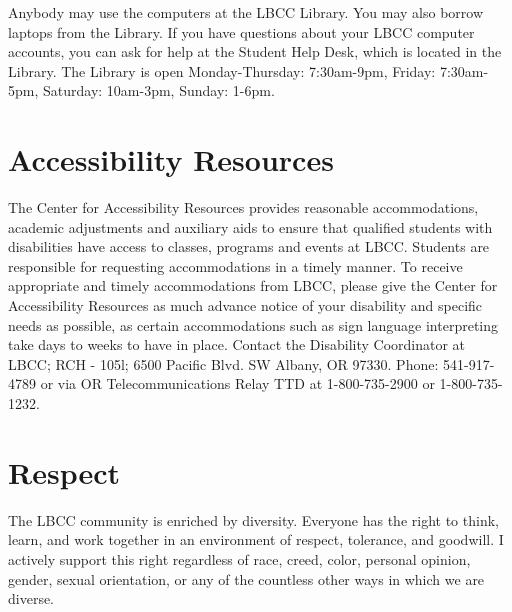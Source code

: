 \documentclass[12pt,article,oneside]{memoir}
\begin{document}
Anybody may use the computers at the LBCC Library. You may also borrow laptops from the Library.  If you have questions about your LBCC computer accounts, you can ask for help at the Student Help Desk, which is located in the Library.  The Library is open Monday-Thursday: 7:30am-9pm, Friday: 7:30am-5pm, Saturday: 10am-3pm, Sunday: 1-6pm.

\section{Accessibility Resources}

The Center for Accessibility Resources provides reasonable accommodations, academic adjustments and auxiliary aids to ensure that qualified students with disabilities have access to classes, programs and events at LBCC. Students are responsible for requesting accommodations in a timely manner. To receive appropriate and timely accommodations from LBCC, please give the Center for Accessibility Resources as much advance notice of your disability and specific needs as possible, as certain accommodations such as  sign language interpreting take days to weeks to have in place. Contact the Disability Coordinator at LBCC; RCH - 105l; 6500 Pacific Blvd. SW Albany, OR 97330. Phone: 541-917-4789 or via OR Telecommunications Relay TTD at 1-800-735-2900 or 1-800-735-1232.

\section{Respect}

The LBCC community is enriched by diversity. Everyone has the right to think, learn, and work together in an environment of respect, tolerance, and goodwill. I actively support this right regardless of race, creed, color, personal opinion, gender, sexual orientation, or any of the countless other ways in which we are diverse.  

\end{document}
